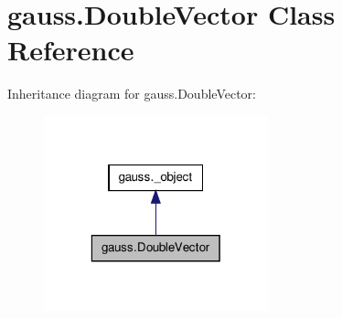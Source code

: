 \hypertarget{classgauss_1_1_double_vector}{\section{gauss.\-Double\-Vector Class Reference}
\label{classgauss_1_1_double_vector}
}


Inheritance diagram for gauss.\-Double\-Vector\-:\nopagebreak
\begin{figure}[H]
\begin{center}
\leavevmode
\includegraphics[width=184pt]{classgauss_1_1_double_vector__inherit__graph}
\end{center}
\end{figure}
